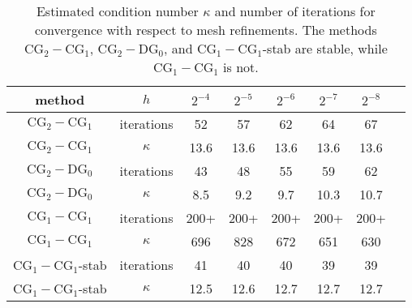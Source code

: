 \begin{table}
  \centering
  \begin{tabular}{cccccccc}
    \toprule
    method & $h$ & $2^{-4}$ & $2^{-5}$ & $2^{-6}$ & $2^{-7}$ & $2^{-8}$ \\
    \midrule
    $\mathrm{CG}_2-\mathrm{CG}_1$ &  iterations & 52 & 57 & 62 & 64 & 67 \\
    $\mathrm{CG}_2-\mathrm{CG}_1$ & $\kappa $ & 13.6 & 13.6 & 13.6 & 13.6 & 13.6 \\
    $\mathrm{CG}_2-\mathrm{DG}_0$ &  iterations & 43 & 48 & 55 & 59 & 62 \\
    $\mathrm{CG}_2-\mathrm{DG}_0$ & $\kappa $ & 8.5 & 9.2 & 9.7 & 10.3 & 10.7 \\
    $\mathrm{CG}_1-\mathrm{CG}_1$ & iterations & 200+ & 200+ & 200+ & 200+ & 200+ \\
    $\mathrm{CG}_1-\mathrm{CG}_1$ & $\kappa$ & 696 & 828 & 672 & 651 & 630 \\
    $\mathrm{CG}_1-\mathrm{CG}_1$-stab& iterations & 41 & 40 & 40 & 39 & 39 \\
    $\mathrm{CG}_1-\mathrm{CG}_1$-stab& $\kappa $ & 12.5 & 12.6 & 12.7 & 12.7 & 12.7 \\
    \bottomrule
  \end{tabular}
  \caption{Estimated condition number $\kappa$ and number of
    iterations for convergence with respect to mesh refinements.  The
    methods $\mathrm{CG}_2-\mathrm{CG}_1$,
    $\mathrm{CG}_2-\mathrm{DG}_0$, and
    $\mathrm{CG}_1-\mathrm{CG}_1$-stab are stable, while
    $\mathrm{CG}_1-\mathrm{CG}_1$ is not.}\label{stokes:ex}

\end{table}


